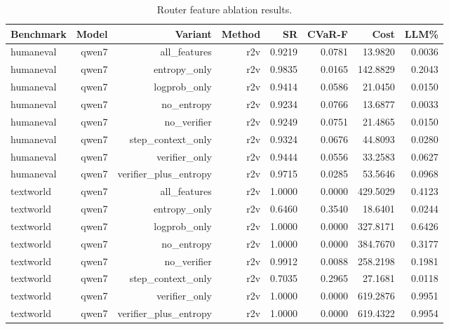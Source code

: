 \begin{table}[t]
\centering
\caption{Router feature ablation results.}
\label{tab:router-feature-ablations}
\begin{tabular}{lrrrrrrr}
\hline
Benchmark & Model & Variant & Method & SR & CVaR-F & Cost & LLM\% \\
\hline
humaneval & qwen7 & all_features & r2v & 0.9219 & 0.0781 & 13.9820 & 0.0036 \\
humaneval & qwen7 & entropy_only & r2v & 0.9835 & 0.0165 & 142.8829 & 0.2043 \\
humaneval & qwen7 & logprob_only & r2v & 0.9414 & 0.0586 & 21.0450 & 0.0150 \\
humaneval & qwen7 & no_entropy & r2v & 0.9234 & 0.0766 & 13.6877 & 0.0033 \\
humaneval & qwen7 & no_verifier & r2v & 0.9249 & 0.0751 & 21.4865 & 0.0150 \\
humaneval & qwen7 & step_context_only & r2v & 0.9324 & 0.0676 & 44.8093 & 0.0280 \\
humaneval & qwen7 & verifier_only & r2v & 0.9444 & 0.0556 & 33.2583 & 0.0627 \\
humaneval & qwen7 & verifier_plus_entropy & r2v & 0.9715 & 0.0285 & 53.5646 & 0.0968 \\
textworld & qwen7 & all_features & r2v & 1.0000 & 0.0000 & 429.5029 & 0.4123 \\
textworld & qwen7 & entropy_only & r2v & 0.6460 & 0.3540 & 18.6401 & 0.0244 \\
textworld & qwen7 & logprob_only & r2v & 1.0000 & 0.0000 & 327.8171 & 0.6426 \\
textworld & qwen7 & no_entropy & r2v & 1.0000 & 0.0000 & 384.7670 & 0.3177 \\
textworld & qwen7 & no_verifier & r2v & 0.9912 & 0.0088 & 258.2198 & 0.1981 \\
textworld & qwen7 & step_context_only & r2v & 0.7035 & 0.2965 & 27.1681 & 0.0118 \\
textworld & qwen7 & verifier_only & r2v & 1.0000 & 0.0000 & 619.2876 & 0.9951 \\
textworld & qwen7 & verifier_plus_entropy & r2v & 1.0000 & 0.0000 & 619.4322 & 0.9954 \\
\hline
\end{tabular}
\end{table}
